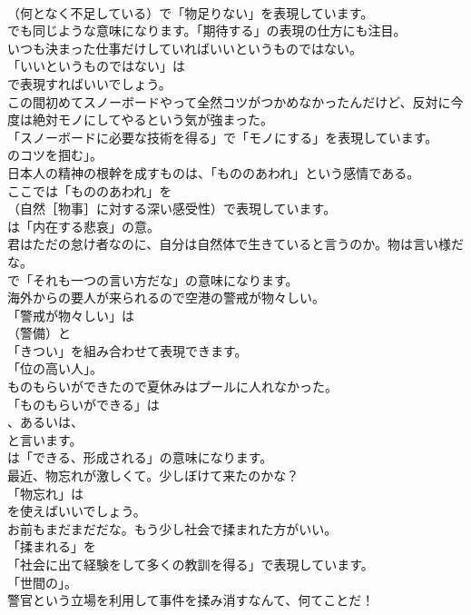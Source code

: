 \documentclass[8pt]{extreport}
\begin{document}
\begin{CJK}{UTF8}{min}
\\	（何となく不足している）で「物足りない」を表現しています。
\\	でも同じような意味になります。「期待する」の表現の仕方にも注目。	
\\	いつも決まった仕事だけしていればいいというものではない。 
\\	「いいというものではない」は 
\\	で表現すればいいでしょう。	
\\	この間初めてスノーボードやって全然コツがつかめなかったんだけど、反対に今度は絶対モノにしてやるという気が強まった。 
\\	「スノーボードに必要な技術を得る」で「モノにする」を表現しています。
\\	のコツを掴む」。	
\\	日本人の精神の根幹を成すものは、「もののあわれ」という感情である。 
\\	ここでは「もののあわれ」を 
\\	（自然［物事］に対する深い感受性）で表現しています。
\\	は「内在する悲哀」の意。	
\\	君はただの怠け者なのに、自分は自然体で生きていると言うのか。物は言い様だな。 
\\	で「それも一つの言い方だな」の意味になります。	
\\	海外からの要人が来られるので空港の警戒が物々しい。 
\\	「警戒が物々しい」は
\\	（警備）と
\\	「きつい」を組み合わせて表現できます。
\\	「位の高い人」。	
\\	ものもらいができたので夏休みはプールに人れなかった。 
\\	「ものもらいができる」は
\\	、あるいは、
\\	と言います。
\\	は「できる、形成される」の意味になります。	
\\	最近、物忘れが激しくて。少しぼけて来たのかな？ 
\\	「物忘れ」は
\\	を使えばいいでしょう。	
\\	お前もまだまだだな。もう少し社会で揉まれた方がいい。 
\\	「揉まれる」を
\\	「社会に出て経験をして多くの教訓を得る」で表現しています。
\\	「世間の」。	
\\	警官という立場を利用して事件を揉み消すなんて、何てことだ！ 

\end{CJK}
\end{document}
